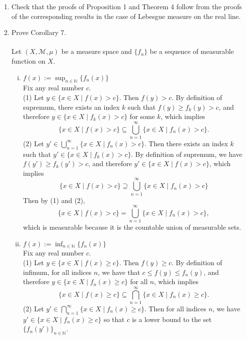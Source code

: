 \begin{enumerate}
    \item Check that the proofs of Proposition 1 and Theorem 4 follow from the proofs of the corresponding results in the case of Lebesgue measure on the real line.
    \item Prove Corollary 7.\\
    \\Let $(X,\mathcal{M},\mu)$ be a measure space and $\{f_n\}$ be a sequence of measurable function on $X$.
    \\\begin{enumerate}[(i)]
        \item $f(x):=\sup_{n\in\mathbb{N}}\{f_n(x)\}$
        \\Fix any real number $c$.
        \\(1) Let $y\in\{x\in X\mid f(x)>c\}$.
        Then $f(y)>c$.
        By definition of supremum, there exists an index $k$ such that $f(y)\ge f_k(y)>c$, and therefore $y\in\{x\in X\mid f_k(x)>c\}$ for some $k$, which implies
        \[
            \{x\in X\mid f(x)>c\}\subseteq\bigcup_{n=1}^\infty\{x\in X\mid f_n(x)>c\}.\tag{1}
        \]
        (2) Let $y'\in\bigcup_{n=1}^\infty\{x\in X\mid f_n(x)>c\}$.
        Then there exists an index $k$ such that $y'\in\{x\in X\mid f_k(x)>c\}$.
        By definition of supremum, we have $f(y')\ge f_k(y')>c$, and therefore $y'\in\{x\in X\mid f(x)>c\}$, which implies
        \[
            \{x\in X\mid f(x)>c\}\supseteq\bigcup_{n=1}^\infty\{x\in X\mid f_n(x)>c\}\tag{2}
        \]
        Then by (1) and (2),
        \[
            \{x\in X\mid f(x)>c\}=\bigcup_{n=1}^\infty\{x\in X\mid f_n(x)>c\},
        \]
        which is measurable because it is the countable union of measurable sets.
        \item $f(x):=\inf_{n\in\mathbb{N}}\{f_n(x)\}$
        \\Fix any real number $c$.
        \\(1) Let $y\in\{x\in X\mid f(x)\ge c\}$.
        Then $f(y)\ge c$.
        By definition of infimum, for all indices $n$, we have that $c\le f(y)\le f_n(y)$, and therefore $y\in\{x\in X\mid f_n(x)\ge c\}$ for all $n$, which implies
        \[
            \{x\in X\mid f(x)\ge c\}\subseteq\bigcap_{n=1}^\infty\{x\in X\mid f_n(x)\ge c\}.\tag{1}
        \]
        (2) Let $y'\in\bigcap_{n=1}^\infty\{x\in X\mid f_n(x)\ge c\}$.
        Then for all indices $n$, we have $y'\in\{x\in X\mid f_n(x)\ge c\}$ so that $c$ is a lower bound to the set $\{f_n(y')\}_{n\in\mathbb{N}}$.

\end{enumerate}
\end{enumerate}
